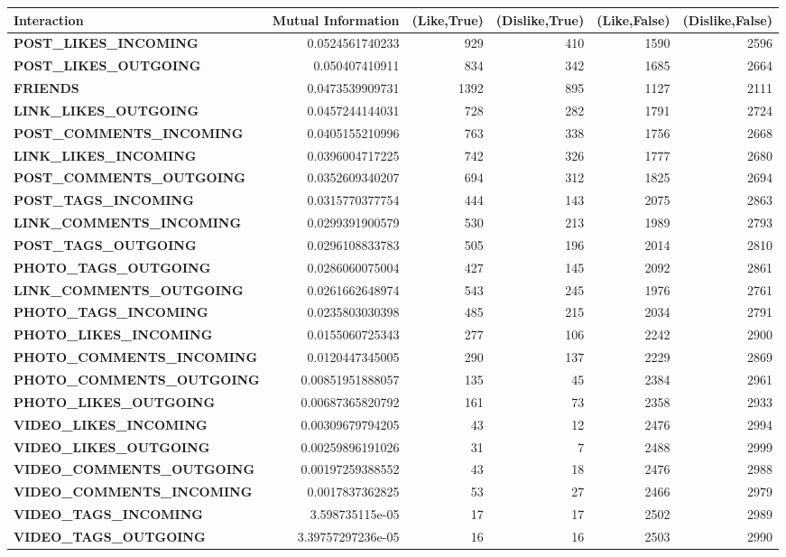 \begin{table}
	\centering
	\begin{tabular}{| >{\small}l | >{\small}r | >{\small}r | >{\small}r | >{\small}r | >{\small}r |}
	\hline
	Interaction & Mutual Information & (Like,True) & (Dislike,True) & (Like,False) & (Dislike,False)\\
	\hline
	\textbf{POST\_LIKES\_INCOMING} & 0.0524561740233 & 929 & 410 & 1590 & 2596\\
	\hline
	\textbf{POST\_LIKES\_OUTGOING}& 0.050407410911 & 834 & 342 & 1685 & 2664\\
	\hline
	\textbf{FRIENDS} & 0.0473539909731 & 1392 & 895 & 1127 & 2111\\
	\hline
	\textbf{LINK\_LIKES\_OUTGOING}& 0.0457244144031 & 728 & 282 & 1791 & 2724\\
	\hline
	\textbf{POST\_COMMENTS\_INCOMING}& 0.0405155210996 & 763 & 338 & 1756 & 2668\\
	\hline
	\textbf{LINK\_LIKES\_INCOMING}& 0.0396004717225 & 742 & 326 & 1777 & 2680\\
	\hline
	\textbf{POST\_COMMENTS\_OUTGOING}& 0.0352609340207 & 694 & 312 & 1825 & 2694\\
	\hline
	\textbf{POST\_TAGS\_INCOMING}& 0.0315770377754 & 444 & 143 & 2075 & 2863\\
	\hline
	\textbf{LINK\_COMMENTS\_INCOMING}& 0.0299391900579 & 530 & 213 & 1989 & 2793\\
	\hline
	\textbf{POST\_TAGS\_OUTGOING}& 0.0296108833783 & 505 & 196 & 2014 & 2810\\
	\hline
	\textbf{PHOTO\_TAGS\_OUTGOING}& 0.0286060075004 & 427 & 145 & 2092 & 2861\\
	\hline
	\textbf{LINK\_COMMENTS\_OUTGOING}& 0.0261662648974 & 543 & 245 & 1976 & 2761\\
	\hline
	\textbf{PHOTO\_TAGS\_INCOMING}& 0.0235803030398 & 485 & 215 & 2034 & 2791\\
	\hline
	\textbf{PHOTO\_LIKES\_INCOMING}& 0.0155060725343 & 277 & 106 & 2242 & 2900\\
	\hline
	\textbf{PHOTO\_COMMENTS\_INCOMING}& 0.0120447345005 & 290 & 137 & 2229 & 2869\\
	\hline
	\textbf{PHOTO\_COMMENTS\_OUTGOING}& 0.00851951888057 & 135 & 45 & 2384 & 2961\\
	\hline
	\textbf{PHOTO\_LIKES\_OUTGOING}& 0.00687365820792 & 161 & 73 & 2358 & 2933\\
	\hline
	\textbf{VIDEO\_LIKES\_INCOMING}& 0.00309679794205 & 43 & 12 & 2476 & 2994\\
	\hline
	\textbf{VIDEO\_LIKES\_OUTGOING}& 0.00259896191026 & 31 & 7 & 2488 & 2999\\
	\hline
	\textbf{VIDEO\_COMMENTS\_OUTGOING}& 0.00197259388552 & 43 & 18 & 2476 & 2988\\
	\hline
	\textbf{VIDEO\_COMMENTS\_INCOMING}& 0.0017837362825 & 53 & 27 & 2466 & 2979\\
	\hline
	\textbf{VIDEO\_TAGS\_INCOMING}& 3.598735115e-05 & 17 & 17 & 2502 & 2989\\
	\hline
	\textbf{VIDEO\_TAGS\_OUTGOING}& 3.39757297236e-05 & 16 & 16 & 2503 & 2990\\
	\hline
	\end{tabular}
\end{table}

	